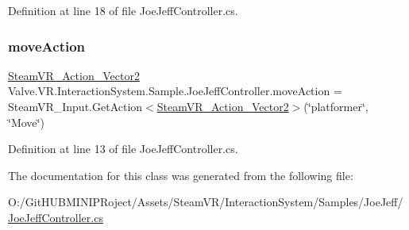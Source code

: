 Definition at line 18 of file Joe\+Jeff\+Controller.\+cs.

\mbox{\label{class_valve_1_1_v_r_1_1_interaction_system_1_1_sample_1_1_joe_jeff_controller_a34bb846e7157ea3e272f8b5bd46fc106}} 
\subsubsection{\texorpdfstring{moveAction}{moveAction}}
{\footnotesize\ttfamily \mbox{\hyperlink{class_valve_1_1_v_r_1_1_steam_v_r___action___vector2}{Steam\+V\+R\+\_\+\+Action\+\_\+\+Vector2}} Valve.\+V\+R.\+Interaction\+System.\+Sample.\+Joe\+Jeff\+Controller.\+move\+Action = Steam\+V\+R\+\_\+\+Input.\+Get\+Action$<$\mbox{\hyperlink{class_valve_1_1_v_r_1_1_steam_v_r___action___vector2}{Steam\+V\+R\+\_\+\+Action\+\_\+\+Vector2}}$>$(\char`\"{}platformer\char`\"{}, \char`\"{}Move\char`\"{})}



Definition at line 13 of file Joe\+Jeff\+Controller.\+cs.



The documentation for this class was generated from the following file\+:\begin{DoxyCompactItemize}
\item 
O\+:/\+Git\+H\+U\+B\+M\+I\+N\+I\+P\+Roject/\+Assets/\+Steam\+V\+R/\+Interaction\+System/\+Samples/\+Joe\+Jeff/\mbox{\hyperlink{_joe_jeff_controller_8cs}{Joe\+Jeff\+Controller.\+cs}}\end{DoxyCompactItemize}
